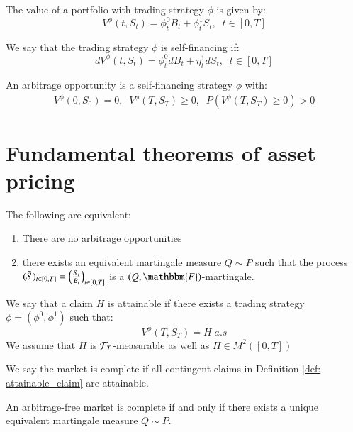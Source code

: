 \begin{definition}
The value of a portfolio with trading strategy $\phi$ is given by:
$$
V^{\phi}(t,S_{t}) = \phi_{t}^{0}B_{t} + \phi_{t}^{1}S_{t},\;\; t \in[0,T]
$$
\end{definition}


\begin{definition}
We say that the trading strategy $\phi$ is self-financing if:
$$
dV^{\phi}(t,S_{t}) = \phi_{t}^{0}dB_{t} + \eta_{t}^{1}dS_{t}, \;\; t\in [0,T] 
$$
\end{definition}

\begin{definition}
An arbitrage opportunity is a self-financing strategy $\phi$ with:
\begin{align*}
V^{\phi}(0,S_{0}) = 0, \;\; V^{\phi}(T,S_{T}) \geq 0, \;\; P(V^{\phi}(T,S_{T}) \geq 0) > 0    
\end{align*}
\end{definition}


\section{Fundamental theorems of asset pricing}

\begin{theorem}
\label{thm: First_fundamental_thm_asset_price}
The following are equivalent:
\begin{enumerate}[label=\roman*, leftmargin=*]
    \item There are no arbitrage opportunities
    \item there exists an equivalent martingale measure $Q\sim P$ such that the process $(\Tilde{S})_{t \in [0,T]} = \left(\frac{S_{t}}{B_{t}}\right)_{t\in [0,T]}$ is a $(Q, \mathbbm{F})$-martingale. 
\end{enumerate}
\end{theorem}

\begin{definition}
\label{def: attainable_claim}
We say that a claim $H$ is attainable if there exists a trading strategy $\phi = (\phi^{0}, \phi^{1})$ such that:
$$
V^{\phi}(T,S_{T}) = H \; a.s
$$
We assume that $H$ is $\mathcal{F}_{T}$-measurable as well as $H\in M^{2}([0,T])$
\end{definition}

\begin{definition}
We say the market is complete if all contingent claims in Definition \ref{def: attainable_claim} are attainable.     
\end{definition}

\begin{theorem}
An arbitrage-free market is complete if and only if there exists a unique equivalent martingale measure $Q\sim P$.    
\end{theorem}